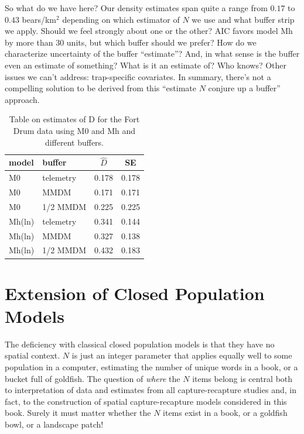 So what do we have here?  Our density estimates span quite a range
from $0.17$ to $0.43$ bears/km$^2$ depending on which estimator of $N$ we use and
what buffer strip we apply. Should we feel strongly about one or the other?
AIC favors model Mh by more than 30 units, but which buffer should we
prefer?  
How do we characterize uncertainty of the buffer ``estimate''?  And,
in what sense is the
buffer even an estimate of something? What is it an estimate of? Who
knows?  Other issues we can't address: trap-specific covariates.
In summary, there's not a compelling solution to be derived from
this ``estimate $N$ conjure up a buffer'' approach. 

\begin{table}[ht]
\centering
\caption{Table on estimates of D for the Fort Drum data
using M0 and Mh and different buffers.}
\begin{tabular}{ll|cc} 
\hline
model & buffer &  $\hat{D}$ & SE \\ \hline
M0   & telemetry &  0.178 & 0.178 \\
M0    & MMDM     &  0.171 & 0.171\\
M0   & 1/2 MMDM  &  0.225 & 0.225\\
Mh(ln) & telemetry &0.341 & 0.144\\
Mh(ln) & MMDM    &  0.327 & 0.138\\
Mh(ln) & 1/2 MMDM & 0.432 & 0.183\\
\end{tabular}
\label{tab.fdests}
\end{table}

\section{Extension of Closed Population Models}

The deficiency with classical closed population models is that they
have no spatial context. $N$ is just an integer parameter that applies
equally well to some population in a computer, estimating the number
of unique words in a book, or a bucket full of goldfish.  The question
of {\it where} the $N$ items belong is central both to interpretation
of data and estimates from all capture-recapture studies and, in fact,
to the construction of spatial capture-recapture models considered in
this book.  Surely it must matter whether the $N$ items exist 
in a book, or a goldfish bowl, or a landscape patch!

